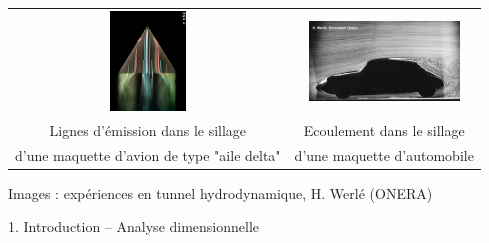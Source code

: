 \begin{frame}
\begin{tabular}{cc}
\includegraphics[width=20mm]{./Figures/Werle_aileDelta.jpeg}
&
\includegraphics[width=40mm]{./Figures/Werle_Voiture.jpeg}
\\
\small Lignes d'émission dans le sillage  
&
\small Ecoulement dans le sillage 
\\
\small d'une maquette d'avion de type "aile delta"
&
\small d'une maquette d'automobile
\end{tabular}

\medskip
{\small \color{gray}
Images : expériences en tunnel hydrodynamique, H. Werlé (ONERA)
}

  \vspace{12mm}
  
  \begin{flushright}
    
    \Large
   	\bf
    
    1. Introduction -- Analyse dimensionnelle

  \end{flushright}

\end{frame}




%
%
%  
%
%
%


